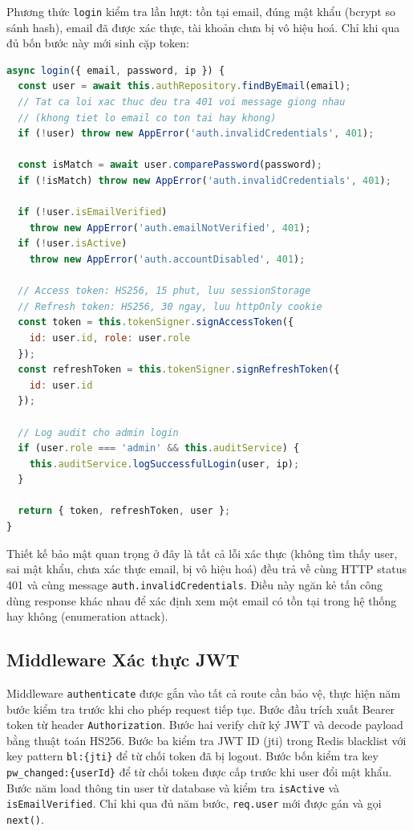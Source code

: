 Phương thức \texttt{login} kiểm tra lần lượt: tồn tại email, đúng mật khẩu (bcrypt so sánh hash), email đã được xác thực, tài khoản chưa bị vô hiệu hoá. Chỉ khi qua đủ bốn bước này mới sinh cặp token:

\begin{lstlisting}[language=JavaScript, caption={AuthService.login() — xác thực và sinh JWT (auth-service.js)}]
async login({ email, password, ip }) {
  const user = await this.authRepository.findByEmail(email);
  // Tat ca loi xac thuc deu tra 401 voi message giong nhau
  // (khong tiet lo email co ton tai hay khong)
  if (!user) throw new AppError('auth.invalidCredentials', 401);

  const isMatch = await user.comparePassword(password);
  if (!isMatch) throw new AppError('auth.invalidCredentials', 401);

  if (!user.isEmailVerified)
    throw new AppError('auth.emailNotVerified', 401);
  if (!user.isActive)
    throw new AppError('auth.accountDisabled', 401);

  // Access token: HS256, 15 phut, luu sessionStorage
  // Refresh token: HS256, 30 ngay, luu httpOnly cookie
  const token = this.tokenSigner.signAccessToken({
    id: user.id, role: user.role
  });
  const refreshToken = this.tokenSigner.signRefreshToken({
    id: user.id
  });

  // Log audit cho admin login
  if (user.role === 'admin' && this.auditService) {
    this.auditService.logSuccessfulLogin(user, ip);
  }

  return { token, refreshToken, user };
}
\end{lstlisting}

Thiết kế bảo mật quan trọng ở đây là tất cả lỗi xác thực (không tìm thấy user, sai mật khẩu, chưa xác thực email, bị vô hiệu hoá) đều trả về cùng HTTP status 401 và cùng message \texttt{auth.invalidCredentials}. Điều này ngăn kẻ tấn công dùng response khác nhau để xác định xem một email có tồn tại trong hệ thống hay không (enumeration attack).

\subsection{Middleware Xác thực JWT}

Middleware \texttt{authenticate} được gắn vào tất cả route cần bảo vệ, thực hiện năm bước kiểm tra trước khi cho phép request tiếp tục. Bước đầu trích xuất Bearer token từ header \texttt{Authorization}. Bước hai verify chữ ký JWT và decode payload bằng thuật toán HS256. Bước ba kiểm tra JWT ID (jti) trong Redis blacklist với key pattern \texttt{bl:\{jti\}} để từ chối token đã bị logout. Bước bốn kiểm tra key \texttt{pw\_changed:\{userId\}} để từ chối token được cấp trước khi user đổi mật khẩu. Bước năm load thông tin user từ database và kiểm tra \texttt{isActive} và \texttt{isEmailVerified}. Chỉ khi qua đủ năm bước, \texttt{req.user} mới được gán và gọi \texttt{next()}.

